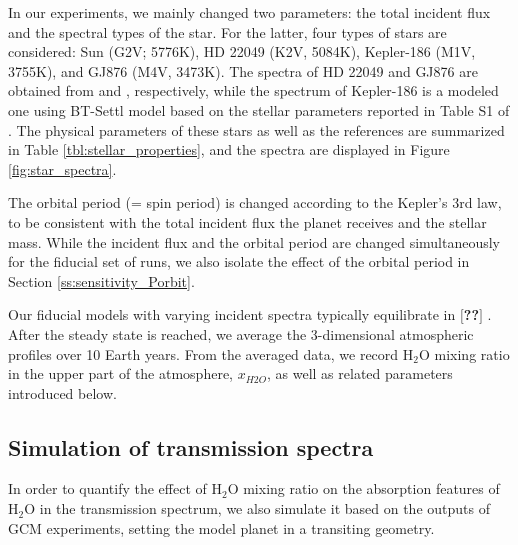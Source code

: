 \documentclass[11pt,numberedappendix,twocolappendix,]{emulateapj}
\def\water{H$_2$O }
\def\memo#1{\color{red}$[${\bf #1}$]$ \color{black}}
\begin{document}
In our experiments, we mainly changed two parameters: the total incident flux and the spectral types of the star. 
For the latter, four types of stars are considered: 
Sun (G2V; 5776K), 
HD 22049 (K2V, 5084K), 
Kepler-186 (M1V, 3755K), and 
GJ876 (M4V, 3473K). 
The spectra of HD 22049 and GJ876 are obtained from \citet{Segura2003} and \citet{Domagal-Goldman2014}, respectively, 
while the spectrum of Kepler-186 is a modeled one using BT-Settl model \citep{Allard2012} based on the stellar parameters reported in Table S1 of \citet{Quintana2014}. 
The physical parameters of these stars as well as the references are summarized in Table \ref{tbl:stellar_properties}, and the spectra are displayed in Figure \ref{fig:star_spectra}. 

The orbital period (= spin period) is changed according to the Kepler's 3rd law, to be consistent with the total incident flux the planet receives and the stellar mass. While the incident flux and the orbital period are changed simultaneously for the fiducial set of runs, we also isolate the effect of the orbital period in Section \ref{ss:sensitivity_Porbit}. 

Our fiducial models with varying incident spectra typically equilibrate in \memo{??}. 
After the steady state is reached, we average the 3-dimensional atmospheric profiles over 10 Earth years. 
From the averaged data, we record \water mixing ratio in the upper part of the atmosphere, $x_{H2O}$, as well as related parameters introduced below. 


\subsection{Simulation of transmission spectra}

In order to quantify the effect of \water mixing ratio on the absorption features of \water in the transmission spectrum, 
we also simulate it based on the outputs of GCM experiments, setting the model planet in a transiting geometry. 
\end{document}
